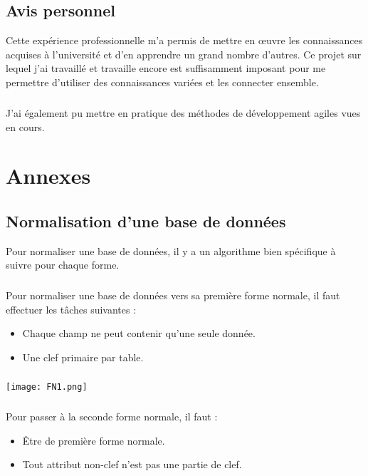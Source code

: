 \documentclass[a4paper,12pt,titlepage]{report}
\begin{document}
\newpage

\section{Avis personnel}


Cette expérience professionnelle m'a permis de mettre en œuvre les connaissances acquises à l'université et d'en apprendre un grand nombre d'autres. Ce projet sur lequel j'ai travaillé et travaille encore est suffisamment imposant pour me permettre d'utiliser des connaissances variées et les connecter ensemble.
\paragraph*{}
J'ai également pu mettre en pratique des méthodes de développement agiles vues en cours.


\chapter{Annexes}


\section{Normalisation d'une base de données}

Pour normaliser une base de données, il y a un algorithme bien spécifique à suivre pour chaque forme.
\paragraph*{}
Pour normaliser une base de données vers sa première forme normale, il faut effectuer les tâches suivantes :

\begin{itemize}
\item Chaque champ ne peut contenir qu'une seule donnée.
\item Une clef primaire par table.
\end{itemize}

\paragraph*{}

\texttt{[image: FN1.png]}

\newpage

\paragraph*{}
Pour passer à la seconde forme normale, il faut :
\begin{itemize}
\item Être de première forme normale.
\item Tout attribut non-clef n'est pas une partie de clef.
\end{itemize}
\end{document}

